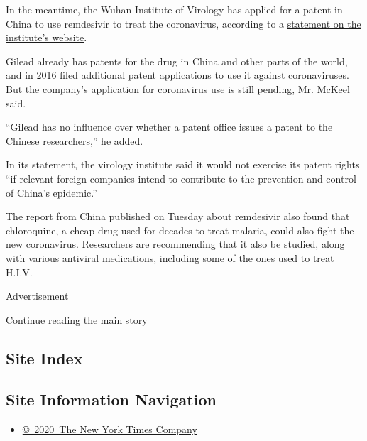 In the meantime, the Wuhan Institute of Virology has applied for a
patent in China to use remdesivir to treat the coronavirus, according to
a
\href{http://www.whiov.ac.cn/kyjz_105338/202002/t20200204_5497136.html?from=groupmessage}{statement
on the institute's website}.

Gilead already has patents for the drug in China and other parts of the
world, and in 2016 filed additional patent applications to use it
against coronaviruses. But the company's application for coronavirus use
is still pending, Mr. McKeel said.

``Gilead has no influence over whether a patent office issues a patent
to the Chinese researchers,'' he added.

In its statement, the virology institute said it would not exercise its
patent rights ``if relevant foreign companies intend to contribute to
the prevention and control of China's epidemic.''

The report from China published on Tuesday about remdesivir also found
that chloroquine, a cheap drug used for decades to treat malaria, could
also fight the new coronavirus. Researchers are recommending that it
also be studied, along with various antiviral medications, including
some of the ones used to treat H.I.V.

Advertisement

\protect\hyperlink{after-bottom}{Continue reading the main story}

\hypertarget{site-index}{%
\subsection{Site Index}\label{site-index}}

\hypertarget{site-information-navigation}{%
\subsection{Site Information
Navigation}\label{site-information-navigation}}

\begin{itemize}
\tightlist
\item
  \href{https://help.nytimes3xbfgragh.onion/hc/en-us/articles/115014792127-Copyright-notice}{©~2020~The
  New York Times Company}
\end{itemize}

